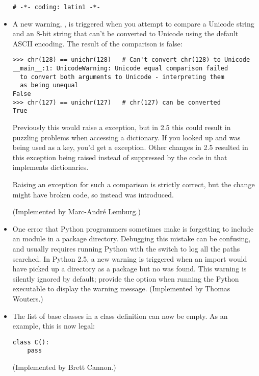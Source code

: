 \documentclass{howto}
\begin{document}
\begin{itemize}
\begin{verbatim}
# -*- coding: latin1 -*-
\end{verbatim}

\item A new warning, , is triggered when 
you attempt to compare a Unicode string and an 8-bit string 
that can't be converted to Unicode using the default ASCII encoding.  
The result of the comparison is false:

\begin{verbatim}
>>> chr(128) == unichr(128)   # Can't convert chr(128) to Unicode
__main__:1: UnicodeWarning: Unicode equal comparison failed 
  to convert both arguments to Unicode - interpreting them 
  as being unequal
False
>>> chr(127) == unichr(127)   # chr(127) can be converted
True
\end{verbatim}

Previously this would raise a  exception,
but in 2.5 this could result in puzzling problems when accessing a
dictionary.  If you looked up  and 
was being used as a key, you'd get a 
exception.  Other changes in 2.5 resulted in this exception being
raised instead of suppressed by the code in  that
implements dictionaries.

Raising an exception for such a comparison is strictly correct, but
the change might have broken code, so instead 
 was introduced.

(Implemented by Marc-Andr\'e Lemburg.)

\item One error that Python programmers sometimes make is forgetting
to include an  module in a package directory.
Debugging this mistake can be confusing, and usually requires running
Python with the  switch to log all the paths searched.
In Python 2.5, a new  warning is triggered when
an import would have picked up a directory as a package but no
 was found.  This warning is silently ignored by default;
provide the  option when running the Python executable
to display the warning message.
(Implemented by Thomas Wouters.)

\item The list of base classes in a class definition can now be empty.  
As an example, this is now legal:

\begin{verbatim}
class C():
    pass
\end{verbatim}
(Implemented by Brett Cannon.)

\end{itemize}
\end{document}
